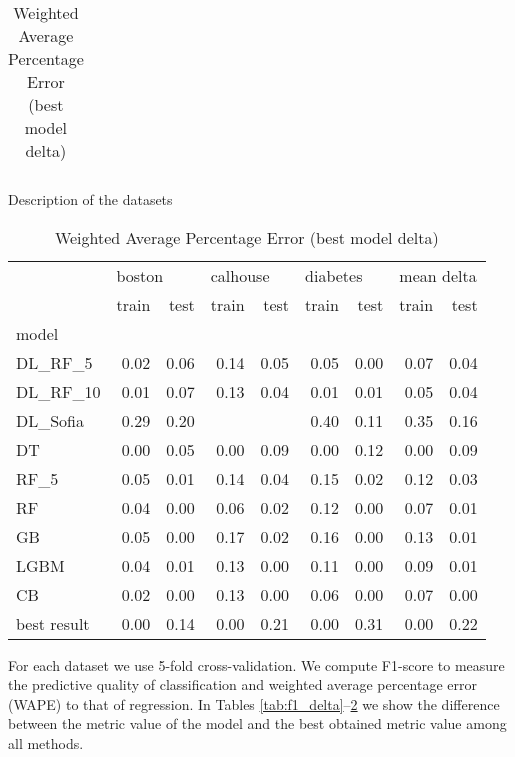 \documentclass[runningheads]{llncs}
\begin{document}
\begin{savenotes}
\begin{table}[]
{\begin{tabular}{l|rrrr}
\end{tabular}
\caption{Description of the datasets}
    \label{tab:dataset_desc}
}
\hfill
\parbox{.45\linewidth}{

    \centering
    \tabcolsep=0.06cm
     \fontsize{6}{8}\selectfont
\begin{tabular}{l||rr|rr|rr||rr}
\toprule
{} & \multicolumn{2}{l}{boston} & \multicolumn{2}{l}{calhouse} & \multicolumn{2}{l}{diabetes} & \multicolumn{2}{l}{mean delta} \\
{} &  train &  test &    train &  test &    train &  test &     train &  test \\
model            &        &       &          &       &          &       &           &       \\
\hline
\hline
DL\_RF\_5          &   0.02 &  0.06 &     0.14 &  0.05 &     0.05 &  0.00 &      0.07 &  0.04 \\
\hline
DL\_RF\_10         &   0.01 &  0.07 &     0.13 &  0.04 &     0.01 &  0.01 &      0.05 &  0.04 \\
\hline
DL\_Sofia         &   0.29 &  0.20 &       &    &     0.40 &  0.11 &      0.35 &  0.16 \\
\hline
DT               &   0.00 &  0.05 &     0.00 &  0.09 &     0.00 &  0.12 &      0.00 &  0.09 \\
RF\_5             &   0.05 &  0.01 &     0.14 &  0.04 &     0.15 &  0.02 &      0.12 &  0.03 \\
RF               &   0.04 &  0.00 &     0.06 &  0.02 &     0.12 &  0.00 &      0.07 &  0.01 \\
GB               &   0.05 &  0.00 &     0.17 &  0.02 &     0.16 &  0.00 &      0.13 &  0.01 \\
LGBM             &   0.04 &  0.01 &     0.13 &  0.00 &     0.11 &  0.00 &      0.09 &  0.01 \\
CB               &   0.02 &  0.00 &     0.13 &  0.00 &     0.06 &  0.00 &      0.07 &  0.00 \\
\hline
\hline
best result      &   0.00 &  0.14 &     0.00 &  0.21 &     0.00 &  0.31 &      0.00 &  0.22 \\
\bottomrule
\end{tabular}
    \caption{Weighted Average Percentage Error (best model delta)}
    \label{tab:wape_delta}
}

\end{table}
\end{savenotes}


For each dataset we use 5-fold cross-validation. We compute F1-score to measure the predictive quality of classification and weighted average percentage error (WAPE) to that of regression. In Tables \ref{tab:f1_delta}--\ref{tab:wape_delta} we show the difference between the metric value of the model and the best obtained metric value among all methods.
\end{document}
